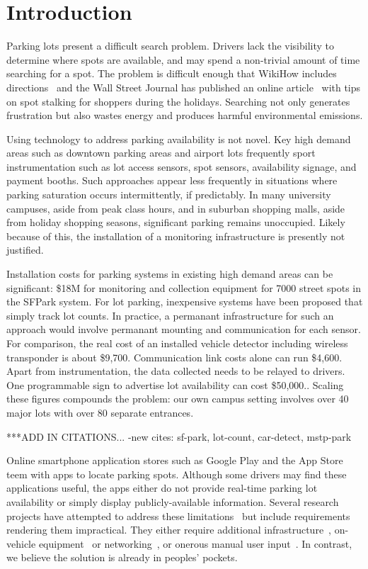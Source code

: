 \section{Introduction}


Parking lots present a difficult search problem. Drivers lack the visibility
to determine where spots are available, and may spend a non-trivial amount of
time searching for a spot. The problem is difficult enough that WikiHow
includes directions~\cite{wikihow-park} and the Wall Street Journal has
published an online article~\cite{wsj-park} with tips on spot stalking for
shoppers during the holidays. Searching not only generates frustration but
also wastes energy and produces harmful environmental emissions.

Using technology to address parking availability is not novel.  Key high
demand areas such as downtown parking areas and airport lots frequently sport
instrumentation such as lot access sensors, spot sensors, availability
signage, and payment booths.  Such approaches appear less frequently  in
situations where parking saturation occurs intermittently, if predictably.
In many university campuses, aside from peak class hours, and in suburban
shopping malls, aside from holiday shopping seasons, significant parking
remains unoccupied.  Likely because of this, the installation of a monitoring
infrastructure is presently not justified.

Installation costs for parking systems in existing high demand areas can be
significant:  \$18M for monitoring and collection equipment for 7000 street
spots in the SFPark system.\cite{sf-park}  For lot parking, inexpensive
systems have been proposed that simply track lot counts.\cite{lot-count}  In
practice, a permanant infrastructure for such an approach would involve
permanant mounting and communication for each sensor.  For comparison, the
real cost of an installed vehicle detector including wireless transponder is
about \$9,700.\cite{car-detect}  Communication link costs alone can run
\$4,600.\cite{mstp-park}  Apart from instrumentation, the data collected
needs to be relayed to drivers.  One programmable sign to advertise lot
availability can cost \$50,000.\cite{mstp-park}.  Scaling these figures
compounds the problem:  our own campus setting involves over 40 major lots
with over 80 separate entrances.

***ADD IN CITATIONS...
-new cites:  sf-park, lot-count, car-detect, mstp-park

Online smartphone application stores such as Google Play and the App Store
teem with apps to locate parking spots. Although some drivers may find these
applications useful, the apps either do not provide real-time parking lot
availability or simply display publicly-available information. Several
research projects have attempted to address these limitations~\cite{4212497,
Chen:2012:COS, Delot:2009:CRP, 5062057, Mathur:2010:PDS} but include
requirements rendering them impractical.  They either require additional
infrastructure~\cite{5062057}, on-vehicle equipment~\cite{Mathur:2010:PDS}
or networking~\cite{Delot:2009:CRP, Mathur:2010:PDS}, or onerous manual user
input~\cite{Chen:2012:COS}. In contrast, we believe the solution is already
in peoples' pockets.

